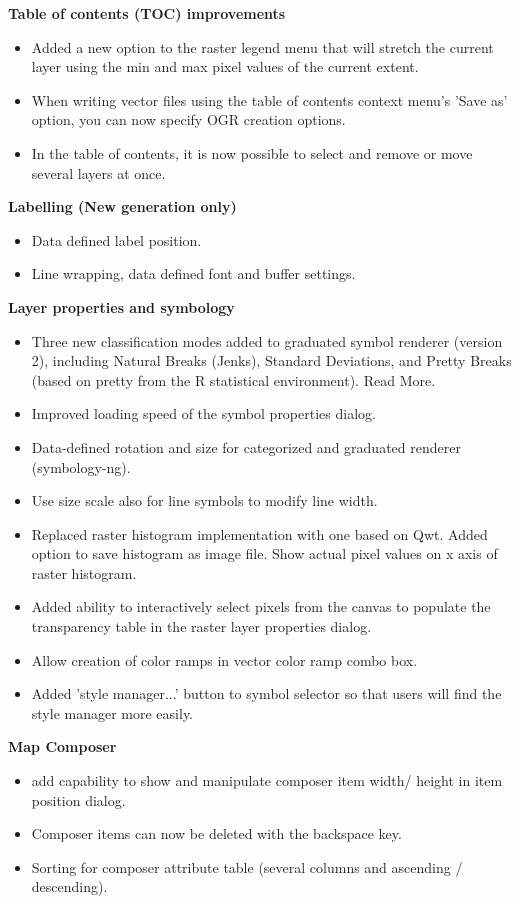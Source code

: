 \textbf{Table of contents (TOC) improvements}

\begin{itemize}[label=--]
\item Added a new option to the raster legend menu that will stretch the current layer using the min and max pixel values of the current extent. 
\item When writing vector files using the table of contents context menu's 'Save as' option, you can now specify OGR creation options. 
\item In the table of contents, it is now possible to select and remove or move several layers at once.
\end{itemize}

\textbf{Labelling (New generation only)}

\begin{itemize}[label=--]
\item Data defined label position. 
\item Line wrapping, data defined font and buffer settings.
\end{itemize}

\textbf{Layer properties and symbology}

\begin{itemize}[label=--]
\item Three new classification modes added to graduated symbol renderer (version 2), including Natural Breaks (Jenks), Standard Deviations, and Pretty Breaks (based on pretty from the R statistical environment). Read More. 
\item Improved loading speed of the symbol properties dialog. 
\item Data-defined rotation and size for categorized and graduated renderer (symbology-ng). 
\item Use size scale also for line symbols to modify line width. 
\item Replaced raster histogram implementation with one based on Qwt. Added option to save histogram as image file. Show actual pixel values on x axis of raster histogram. 
\item Added ability to interactively select pixels from the canvas to populate the transparency table in the raster layer properties dialog. 
\item Allow creation of color ramps in vector color ramp combo box. 
\item Added 'style manager...' button to symbol selector so that users will find the style manager more easily.
\end{itemize}

\textbf{Map Composer}

\begin{itemize}[label=--]
\item add capability to show and manipulate composer item width/ height in item position dialog. 
\item Composer items can now be deleted with the backspace key. 
\item Sorting for composer attribute table (several columns and ascending / descending).
\end{itemize}

